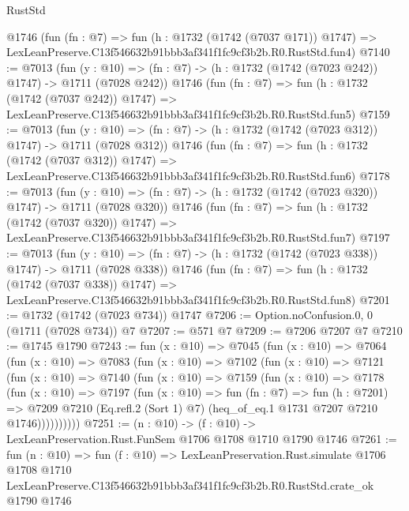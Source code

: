 \begin{lexlean}{RustStd}
\begin{coremodule}
    @1746
    (fun (fn : @7) =>
    fun (h : @1732 (@1742 (@7037 @171)) @1747) =>
    LexLeanPreserve.C13f546632b91bbb3af341f1fc9cf3b2b.R0.RustStd.fun4)
@7140 := @7013
    (fun (y : @10) => (fn : @7) -> (h : @1732 (@1742 (@7023 @242)) @1747) -> @1711 (@7028 @242))
    @1746
    (fun (fn : @7) =>
    fun (h : @1732 (@1742 (@7037 @242)) @1747) =>
    LexLeanPreserve.C13f546632b91bbb3af341f1fc9cf3b2b.R0.RustStd.fun5)
@7159 := @7013
    (fun (y : @10) => (fn : @7) -> (h : @1732 (@1742 (@7023 @312)) @1747) -> @1711 (@7028 @312))
    @1746
    (fun (fn : @7) =>
    fun (h : @1732 (@1742 (@7037 @312)) @1747) =>
    LexLeanPreserve.C13f546632b91bbb3af341f1fc9cf3b2b.R0.RustStd.fun6)
@7178 := @7013
    (fun (y : @10) => (fn : @7) -> (h : @1732 (@1742 (@7023 @320)) @1747) -> @1711 (@7028 @320))
    @1746
    (fun (fn : @7) =>
    fun (h : @1732 (@1742 (@7037 @320)) @1747) =>
    LexLeanPreserve.C13f546632b91bbb3af341f1fc9cf3b2b.R0.RustStd.fun7)
@7197 := @7013
    (fun (y : @10) => (fn : @7) -> (h : @1732 (@1742 (@7023 @338)) @1747) -> @1711 (@7028 @338))
    @1746
    (fun (fn : @7) =>
    fun (h : @1732 (@1742 (@7037 @338)) @1747) =>
    LexLeanPreserve.C13f546632b91bbb3af341f1fc9cf3b2b.R0.RustStd.fun8)
@7201 := @1732 (@1742 (@7023 @734)) @1747
@7206 := Option.noConfusion.{0, 0} (@1711 (@7028 @734)) @7
@7207 := @571 @7
@7209 := @7206 @7207 @7
@7210 := @1745 @1790
@7243 := fun (x : @10) =>
  @7045
    (fun (x : @10) =>
    @7064
      (fun (x : @10) =>
      @7083
        (fun (x : @10) =>
        @7102
          (fun (x : @10) =>
          @7121
            (fun (x : @10) =>
            @7140
              (fun (x : @10) =>
              @7159
                (fun (x : @10) =>
                @7178
                  (fun (x : @10) =>
                  @7197
                    (fun (x : @10) =>
                    fun (fn : @7) =>
                    fun (h : @7201) =>
                    @7209
                      @7210
                      (Eq.refl.{2} (Sort 1) @7)
                      (heq_of_eq.{1} @1731 @7207 @7210 @1746))))))))))
@7251 := (n : @10) -> (f : @10) -> LexLeanPreservation.Rust.FunSem @1706 @1708 @1710 @1790 @1746
@7261 := fun (n : @10) =>
  fun (f : @10) =>
  LexLeanPreservation.Rust.simulate
    @1706
    @1708
    @1710
    LexLeanPreserve.C13f546632b91bbb3af341f1fc9cf3b2b.R0.RustStd.crate_ok
    @1790
    @1746
\end{coremodule}
\end{lexlean}
